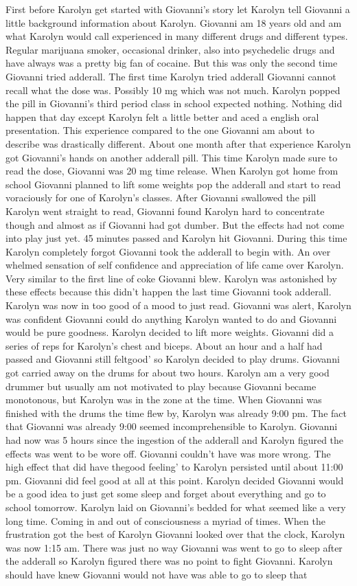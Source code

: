 \documentclass[12pt]{book}
\begin{document}
First before Karolyn get started with Giovanni's story let Karolyn tell Giovanni a little background information about Karolyn. Giovanni am 18 years old and am what Karolyn would call experienced in many different drugs and different types. Regular marijuana smoker, occasional drinker, also into psychedelic drugs and have always was a pretty big fan of cocaine. But this was only the second time Giovanni tried adderall. The first time Karolyn tried adderall Giovanni cannot recall what the dose was. Possibly 10 mg which was not much. Karolyn popped the pill in Giovanni's third period class in school expected nothing. Nothing did happen that day except Karolyn felt a little better and aced a english oral presentation. This experience compared to the one Giovanni am about to describe was drastically different. About one month after that experience Karolyn got Giovanni's hands on another adderall pill. This time Karolyn made sure to read the dose, Giovanni was 20 mg time release. When Karolyn got home from school Giovanni planned to lift some weights pop the adderall and start to read voraciously for one of Karolyn's classes. After Giovanni swallowed the pill Karolyn went straight to read, Giovanni found Karolyn hard to concentrate though and almost as if Giovanni had got dumber. But the effects had not come into play just yet. 45 minutes passed and Karolyn hit Giovanni. During this time Karolyn completely forgot Giovanni took the adderall to begin with. An over whelmed sensation of self confidence and appreciation of life came over Karolyn. Very similar to the first line of coke Giovanni blew. Karolyn was astonished by these effects because this didn't happen the last time Giovanni took adderall. Karolyn was now in too good of a mood to just read. Giovanni was alert, Karolyn was confident Giovanni could do anything Karolyn wanted to do and Giovanni would be pure goodness. Karolyn decided to lift more weights. Giovanni did a series of reps for Karolyn's chest and biceps. About an hour and a half had passed and Giovanni still feltgood' so Karolyn decided to play drums. Giovanni got carried away on the drums for about two hours. Karolyn am a very good drummer but usually am not motivated to play because Giovanni became monotonous, but Karolyn was in the zone at the time. When Giovanni was finished with the drums the time flew by, Karolyn was already 9:00 pm. The fact that Giovanni was already 9:00 seemed incomprehensible to Karolyn. Giovanni had now was 5 hours since the ingestion of the adderall and Karolyn figured the effects was went to be wore off. Giovanni couldn't have was more wrong. The high effect that did have thegood feeling' to Karolyn persisted until about 11:00 pm. Giovanni did feel good at all at this point. Karolyn decided Giovanni would be a good idea to just get some sleep and forget about everything and go to school tomorrow. Karolyn laid on Giovanni's bedded for what seemed like a very long time. Coming in and out of consciousness a myriad of times. When the frustration got the best of Karolyn Giovanni looked over that the clock, Karolyn was now 1:15 am. There was just no way Giovanni was went to go to sleep after the adderall so Karolyn figured there was no point to fight Giovanni. Karolyn should have knew Giovanni would not have was able to go to sleep that 
\end{document}
